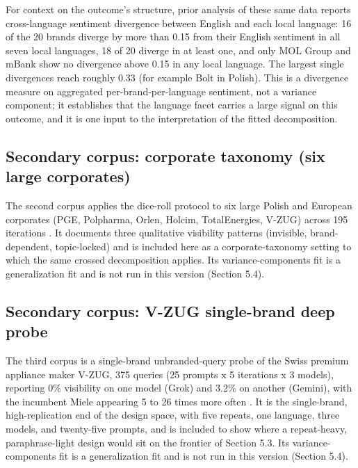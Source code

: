 \documentclass[pdflatex,sn-mathphys-num]{sn-jnl}
\begin{document}
For context on the outcome's structure, prior analysis of these same data \cite{ref20} reports cross-language sentiment divergence between English and each local language: 16 of the 20 brands diverge by more than 0.15 from their English sentiment in all seven local languages, 18 of 20 diverge in at least one, and only MOL Group and mBank show no divergence above 0.15 in any local language. The largest single divergences reach roughly 0.33 (for example Bolt in Polish). This is a divergence measure on aggregated per-brand-per-language sentiment, not a variance component; it establishes that the language facet carries a large signal on this outcome, and it is one input to the interpretation of the fitted decomposition.

\subsection{Secondary corpus: corporate taxonomy (six large corporates)}\label{secondary-corpus-corporate-taxonomy-six-large-corporates}

The second corpus applies the dice-roll protocol to six large Polish and European corporates (PGE, Polpharma, Orlen, Holcim, TotalEnergies, V-ZUG) across 195 iterations \cite{ref21}. It documents three qualitative visibility patterns (invisible, brand-dependent, topic-locked) and is included here as a corporate-taxonomy setting to which the same crossed decomposition applies. Its variance-components fit is a generalization fit and is not run in this version (Section 5.4).

\subsection{Secondary corpus: V-ZUG single-brand deep probe}\label{secondary-corpus-v-zug-single-brand-deep-probe}

The third corpus is a single-brand unbranded-query probe of the Swiss premium appliance maker V-ZUG, 375 queries (25 prompts x 5 iterations x 3 models), reporting 0\% visibility on one model (Grok) and 3.2\% on another (Gemini), with the incumbent Miele appearing 5 to 26 times more often \cite{ref22}. It is the single-brand, high-replication end of the design space, with five repeats, one language, three models, and twenty-five prompts, and is included to show where a repeat-heavy, paraphrase-light design would sit on the frontier of Section 5.3. Its variance-components fit is a generalization fit and is not run in this version (Section 5.4).
\end{document}
